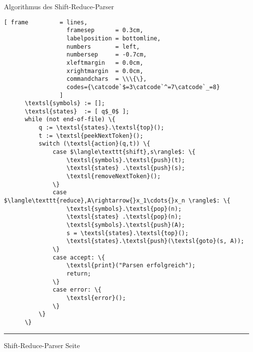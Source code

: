 \documentclass{slides}
\newcounter{mypage}
\begin{document}

\begin{slide}{}
\normalsize
\begin{center}
Algorithmus des Shift-Reduce-Parser
\end{center}
\vspace{0.5cm}

\footnotesize

\begin{Verbatim}[ frame         = lines, 
                  framesep      = 0.3cm, 
                  labelposition = bottomline,
                  numbers       = left,
                  numbersep     = -0.7cm,
                  xleftmargin   = 0.0cm,
                  xrightmargin  = 0.0cm,
                  commandchars  = \\\{\},
                  codes={\catcode`$=3\catcode`^=7\catcode`_=8}
                ]
      \textsl{symbols} := [];
      \textsl{states}  := [ q$_0$ ];
      while (not end-of-file) \{
          q := \textsl{states}.\textsl{top}();
          t := \textsl{peekNextToken}();
          switch (\textsl{action}(q,t)) \{
              case $\langle\texttt{shift},s\rangle$: \{
                  \textsl{symbols}.\textsl{push}(t);
                  \textsl{states} .\textsl{push}(s);
                  \textsl{removeNextToken}();
              \}
              case $\langle\texttt{reduce},A\rightarrow{}x_1\cdots{}x_n \rangle$: \{
                  \textsl{symbols}.\textsl{pop}(n); 
                  \textsl{states} .\textsl{pop}(n);  
                  \textsl{symbols}.\textsl{push}(A);
                  s = \textsl{states}.\textsl{top}();
                  \textsl{states}.\textsl{push}(\textsl{goto}(s, A));
              \}
              case accept: \{
                  \textsl{print}("Parsen erfolgreich");
                  return;
              \} 
              case error: \{
                  \textsl{error}();
              \}
          \}
      \}
\end{Verbatim} 


\vspace*{\fill}
\tiny \addtocounter{mypage}{1}
\rule{17cm}{1mm}
Shift-Reduce-Parser  \hspace*{\fill} Seite 
\end{slide}

\end{document}
